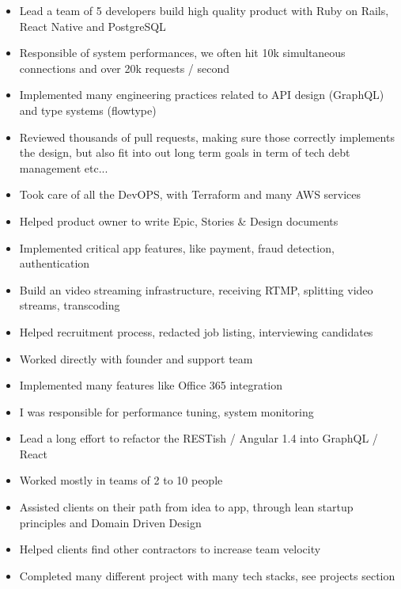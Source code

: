 \documentclass[10pt,a4paper,ragged2e,withhyper]{altacv}
\begin{document}
\begin{paracol}{2}


\begin{itemize}
\item Lead a team of 5 developers build high quality product with Ruby on Rails, React Native and PostgreSQL
\item Responsible of system performances, we often hit 10k simultaneous connections and over 20k requests / second
\item Implemented many engineering practices related to API design (GraphQL) and type systems (flowtype)
\item Reviewed thousands of pull requests, making sure those correctly implements the design, but also fit into out long term goals in term of tech debt management etc...
\item Took care of all the DevOPS, with Terraform and many AWS services
\item Helped product owner to write Epic, Stories \& Design documents
\item Implemented critical app features, like payment, fraud detection, authentication
\item Build an video streaming infrastructure, receiving RTMP, splitting video streams, transcoding
\item Helped recruitment process, redacted job listing, interviewing candidates
\end{itemize}

\divider

\begin{itemize}
\item Worked directly with founder and support team
\item Implemented many features like Office 365 integration
\item I was responsible for performance tuning, system monitoring
\item Lead a long effort to refactor the RESTish / Angular 1.4 into GraphQL / React
\end{itemize}

\divider

\begin{itemize}
  \item Worked mostly in teams of 2 to 10 people
  \item Assisted clients on their path from idea to app, through lean startup principles and Domain Driven Design
  \item Helped clients find other contractors to increase team velocity
  \item Completed many different project with many tech stacks, see projects section
\end{itemize}


\end{paracol}
\end{document}
